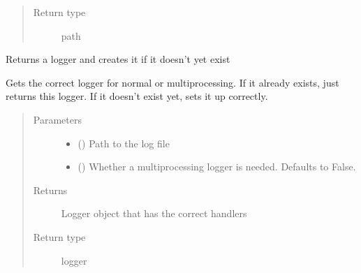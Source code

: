 \documentclass[letterpaper,10pt,english]{sphinxmanual}
\begin{document}
\begin{fulllineitems}
\begin{fulllineitems}
\begin{quote}
\begin{description}
\item[{Return type}] \leavevmode
path

\end{description}\end{quote}

\end{fulllineitems}


\begin{fulllineitems}
\label{\detokenize{index:sites_of_interest_parser.MapsXmlParser.create_logger}}
Returns a logger and creates it if it doesn’t yet exist

Gets the correct logger for normal or multiprocessing. If it already exists, just returns this logger. If it
doesn’t exist yet, sets it up correctly.
\begin{quote}\begin{description}
\item[{Parameters}] \leavevmode\begin{itemize}
\item {} 
 () \textendash{} Path to the log file

\item {} 
 () \textendash{} Whether a multiprocessing logger is needed. Defaults to False.

\end{itemize}

\item[{Returns}] \leavevmode
Logger object that has the correct handlers

\item[{Return type}] \leavevmode
logger

\end{description}\end{quote}

\end{fulllineitems}



\end{fulllineitems}
\end{document}
